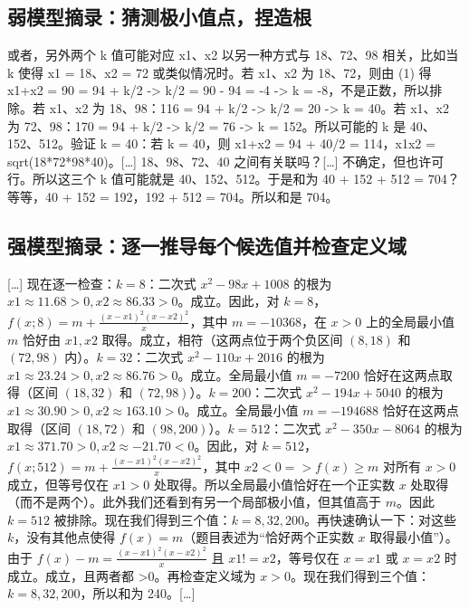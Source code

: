 \documentclass[
  10
]{article}
\begin{document}
\subsection{弱模型摘录：猜测极小值点，捏造根}\label{weak-model-excerpt-guesses-the-minimizers-fabricating-roots}

或者，另外两个 k 值可能对应 x1、x2 以另一种方式与 18、72、98 相关，比如当 k 使得 x1 = 18、x2 = 72 或类似情况时。若 x1、x2 为 18、72，则由 (1) 得 x1+x2 = 90 = 94 + k/2 -> k/2 = 90 - 94 = -4 -> k = -8，不是正数，所以排除。若 x1、x2 为 18、98：116 = 94 + k/2 -> k/2 = 20 -> k = 40。若 x1、x2 为 72、98：170 = 94 + k/2 -> k/2 = 76 -> k = 152。所以可能的 k 是 40、152、512。验证 k = 40：若 k = 40，则 x1+x2 = 94 + 40/2 = 114，x1x2 = sqrt(18*72*98*40)。{[}\ldots{]} 18、98、72、40 之间有关联吗？{[}\ldots{]} 不确定，但也许可行。所以这三个 k 值可能就是 40、152、512。于是和为 40 + 152 + 512 = 704？等等，40 + 152 = 192，192 + 512 = 704。所以和是 704。

\subsection{强模型摘录：逐一推导每个候选值并检查定义域}\label{strong-model-excerpt-derives-each-candidate-and-checks-the-domain}

{[}\ldots{]} 现在逐一检查：$k=8$：二次式 $x^2 - 98 x + 1008$ 的根为 $x1\approx11.68>0, x2\approx86.33>0$。成立。因此，对 $k=8$，$f(x;8)= m + \frac{(x-x1)^2 (x-x2)^2}{x}$，其中 $m= -10368$，在 $x>0$ 上的全局最小值 $m$ 恰好由 $x1,x2$ 取得。成立，相符（这两点位于两个负区间 $(8,18)$ 和 $(72,98)$ 内）。$k=32$：二次式 $x^2 - 110 x + 2016$ 的根为 $x1\approx23.24>0, x2\approx86.76>0$。成立。全局最小值 $m= -7200$ 恰好在这两点取得（区间 $(18,32)$ 和 $(72,98)$）。$k=200$：二次式 $x^2 - 194 x + 5040$ 的根为 $x1\approx30.90>0, x2\approx163.10>0$。成立。全局最小值 $m= -194688$ 恰好在这两点取得（区间 $(18,72)$ 和 $(98,200)$）。$k=512$：二次式 $x^2 - 350 x - 8064$ 的根为 $x1\approx371.70>0, x2\approx -21.70 <0$。因此，对 $k=512$，$f(x;512)= m + \frac{(x-x1)^2 (x-x2)^2}{x}$，其中 $x2<0 =>$$f(x)\geq m$ 对所有 $x>0$ 成立，但等号仅在 $x1>0$ 处取得。所以全局最小值恰好在一个正实数 $x$ 处取得（而不是两个）。此外我们还看到有另一个局部极小值，但其值高于 $m$。因此 $k=512$ 被排除。现在我们得到三个值：$k=8, 32, 200$。再快速确认一下：对这些 $k$，没有其他点使得 $f(x)=m$（题目表述为``恰好两个正实数 $x$ 取得最小值''）。由于 $f(x)-m = \frac{(x-x1)^2 (x-x2)^2}{x}$ 且 $x1!=x2$，等号仅在 $x=x1$ 或 $x=x2$ 时成立。成立，且两者都 >0。再检查定义域为 $x>0$。现在我们得到三个值：$k=8, 32, 200$，所以和为 240。{[}\ldots{]}
\end{document}
